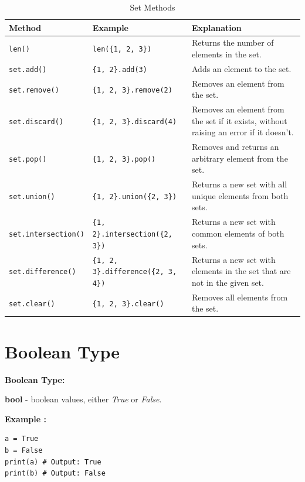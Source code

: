 \documentclass[12pt]{book}
\newtheorem{Example}{Example}[chapter]
\renewenvironment{Example}{\begin{trivlist}\item\relax
\textbf{Example \thesection: }}{\end{trivlist}}
\begin{document}
\begin{table}[h]
\centering
\caption{Set Methods}
\label{tab:set-methods}
\begin{tabular}{|p{4cm}|p{5cm}|p{6.2cm}|}
\hline
\textbf{Method} & \textbf{Example} & \textbf{Explanation} \\
\hline
\texttt{len()} & \texttt{len(\{1, 2, 3\})} & Returns the number of elements in the set. \\
\hline
\texttt{set.add()} & \texttt{\{1, 2\}.add(3)} & Adds an element to the set. \\
\hline
\texttt{set.remove()} & \texttt{\{1, 2, 3\}.remove(2)} & Removes an element from the set. \\
\hline
\texttt{set.discard()} & \texttt{\{1, 2, 3\}.discard(4)} & Removes an element from the set if it exists, without raising an error if it doesn't. \\
\hline
\texttt{set.pop()} & \texttt{\{1, 2, 3\}.pop()} & Removes and returns an arbitrary element from the set. \\
\hline
\texttt{set.union()} & \texttt{\{1, 2\}.union(\{2, 3\})} & Returns a new set with all unique elements from both sets. \\
\hline
\texttt{set.intersection()} & \texttt{\{1, 2\}.intersection(\{2, 3\})} & Returns a new set with common elements of both sets. \\
\hline
\texttt{set.difference()} & \texttt{\{1, 2, 3\}.difference(\{2, 3, 4\})} & Returns a new set with elements in the set that are not in the given set. \\
\hline
\texttt{set.clear()} & \texttt{\{1, 2, 3\}.clear()} & Removes all elements from the set. \\
\hline
\end{tabular}
\end{table}



\section{Boolean Type}
\textbf{Boolean Type:}
\begin{itemize}
\item \textbf{bool} - boolean values, either \textit{True} or \textit{False}.
\begin{Example}
\begin{lstlisting}
a = True
b = False
print(a) # Output: True
print(b) # Output: False
\end{lstlisting}
\end{Example}
\end{itemize}
\end{document}
